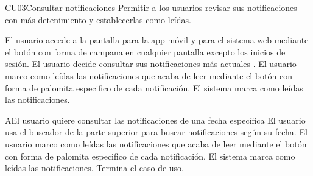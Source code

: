
\begin{UseCase}{CU03}{Consultar notificaciones}{
    Permitir a los usuarios revisar sus notificaciones con más detenimiento y establecerlas como leídas.}

\end{UseCase}

\begin{UCtrayectoria}
    \UCpaso[\UCactor] El usuario accede a la pantalla \label{CU03.introduceDatos} para la app móvil y  para el sistema web mediante el botón con forma de campana en cualquier pantalla excepto los inicios de sesión.
    \UCpaso[\UCactor] El usuario decide consultar sus notificaciones más actuales .
    \UCpaso[\UCactor] El usuario marco como leídas las notificaciones que acaba de leer mediante el botón con forma de palomita especifico de cada notificación.
    \UCpaso El sistema marca como leídas las notificaciones.

\end{UCtrayectoria}

\begin{UCtrayectoriaA}{A}{El usuario quiere consultar las notificaciones de una fecha específica}
	\UCpaso[\UCactor] El usuario usa el buscador de la parte superior para buscar notificaciones según su fecha.
	\UCpaso[\UCactor] El usuario marco como leídas las notificaciones que acaba de leer mediante el botón con forma de palomita especifico de cada notificación.
	\UCpaso El sistema marca como leídas las notificaciones.
	\UCpaso[] Termina el caso de uso.

\end{UCtrayectoriaA}


